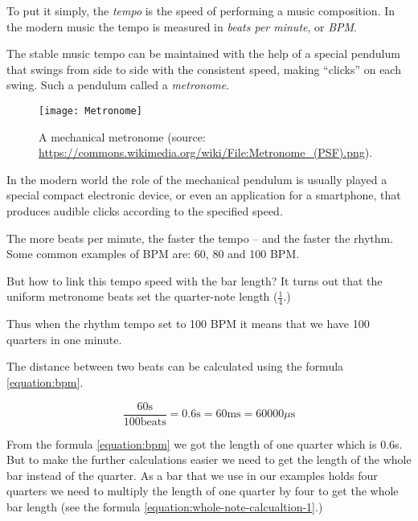 \documentclass[../sparc.tex]{subfiles}
\begin{document}
To put it simply, the \emph{tempo} is the speed of performing a music
composition.  In the modern music the tempo is measured in \emph{beats per
minute}, or \emph{BPM}.

The stable music tempo can be maintained with the help of a special pendulum
that swings from side to side with the consistent speed, making ``clicks'' on
each swing.  Such a pendulum called a \emph{metronome}.

\begin{figure}[h]
  \centering
  \texttt{[image: Metronome]}
  \caption{A mechanical metronome (source:
    \url{https://commons.wikimedia.org/wiki/File:Metronome_(PSF).png}).}
  \label{fig:sound-metronome}
\end{figure}

In the modern world the role of the mechanical pendulum is usually played a
special compact electronic device, or even an application for a smartphone, that
produces audible clicks according to the specified speed.

The more beats per minute, the faster the tempo -- and the faster the rhythm.
Some common examples of \gls{BPM} are: 60, 80 and 100 BPM.

But how to link this tempo speed with the bar length?  It turns out that the
uniform metronome beats set the quarter-note length ($\frac{1}{4}$.)

Thus when the rhythm tempo set to 100 BPM it means that we have 100 quarters in
one minute.


The distance between two beats can be calculated using the formula
\ref{equation:bpm}.

\begin{equation}
  \frac{60 \mbox{s}}{100 \mbox{beats}} = 0.6 \mbox{s} = 60 \mbox{ms} = 60000 \mu\mbox{s}
  \label{equation:bpm}
\end{equation}

From the formula \ref{equation:bpm} we got the length of one quarter which is
0.6s.  But to make the further calculations easier we need to get the length of
the whole bar instead of the quarter.  As a bar that we use in our examples
holds four quarters we need to multiply the length of one quarter by four to get
the whole bar length (see the formula \ref{equation:whole-note-calcualtion-1}.)
\end{document}

